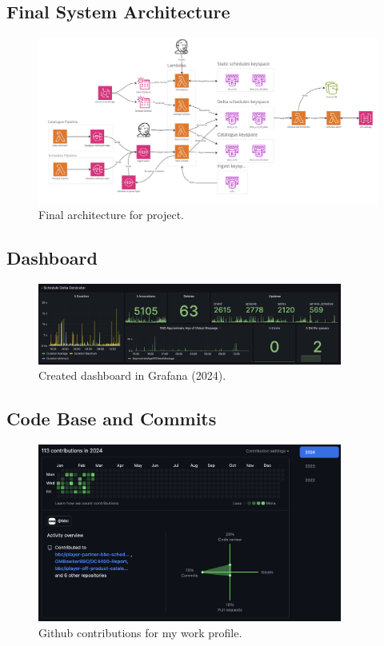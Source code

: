   \newpage
  \subsection{Final System Architecture}

  \begin{landscape}
    \begin{figure}[H]
      \centering
      \includegraphics[width=20cm]{assets/outputs/finalArchitecture.png}
      \caption{Final architecture for project.}
      \label{fig:finalArchitecture}
    \end{figure}
  \end{landscape}

  \newpage
  \subsection{Dashboard}

  \begin{figure}[H]
    \centering
    \includegraphics[width=10cm]{assets/outputs/dashboard.png}
    \caption{Created dashboard in Grafana (2024).}
    \label{fig:dashboard}
  \end{figure}
  
  \newpage
  \subsection{Code Base and Commits}

  \begin{figure}[H]
    \centering
    \includegraphics[width=10cm]{assets/outputs/githubContributions.png}
    \caption{Github contributions for my work profile.}
    \label{fig:githubContributions}
  \end{figure}

\newpage
